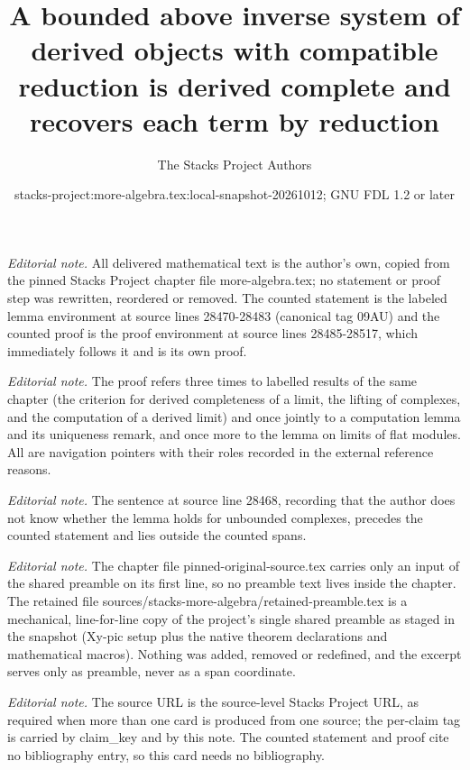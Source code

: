 \documentclass[10pt,a4paper]{amsart}
\title{A bounded above inverse system of derived objects with compatible reduction is derived complete and recovers each term by reduction}
\author{The Stacks Project Authors}
\date{stacks-project:more-algebra.tex:local-snapshot-20261012; GNU FDL 1.2 or later}
\theoremstyle{plain}
\theoremstyle{definition}
\theoremstyle{remark}
\numberwithin{equation}{subsection}
\begin{document}
\maketitle
\setcounter{subsection}{1}
\noindent\textit{Editorial note.} All delivered mathematical text is the author's own, copied from the pinned Stacks Project chapter file more-algebra.tex; no statement or proof step was rewritten, reordered or removed. The counted statement is the labeled lemma environment at source lines 28470-28483 (canonical tag 09AU) and the counted proof is the proof environment at source lines 28485-28517, which immediately follows it and is its own proof.\par\medskip
\noindent\textit{Editorial note.} The proof refers three times to labelled results of the same chapter (the criterion for derived completeness of a limit, the lifting of complexes, and the computation of a derived limit) and once jointly to a computation lemma and its uniqueness remark, and once more to the lemma on limits of flat modules. All are navigation pointers with their roles recorded in the external reference reasons.\par\medskip
\noindent\textit{Editorial note.} The sentence at source line 28468, recording that the author does not know whether the lemma holds for unbounded complexes, precedes the counted statement and lies outside the counted spans.\par\medskip
\noindent\textit{Editorial note.} The chapter file pinned-original-source.tex carries only an input of the shared preamble on its first line, so no preamble text lives inside the chapter. The retained file sources/stacks-more-algebra/retained-preamble.tex is a mechanical, line-for-line copy of the project's single shared preamble as staged in the snapshot (Xy-pic setup plus the native theorem declarations and mathematical macros). Nothing was added, removed or redefined, and the excerpt serves only as preamble, never as a span coordinate.\par\medskip
\noindent\textit{Editorial note.} The source URL is the source-level Stacks Project URL, as required when more than one card is produced from one source; the per-claim tag is carried by claim\_key and by this note. The counted statement and proof cite no bibliography entry, so this card needs no bibliography.\par\medskip
\end{document}

